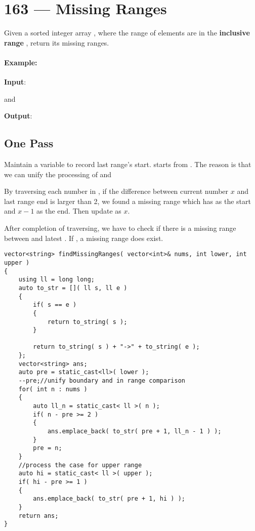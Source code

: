 \section{163 --- Missing Ranges}
Given a sorted integer array , where the range of elements are in the \textbf{inclusive range} , return its missing ranges.

\paragraph{Example:}

\begin{flushleft}
\textbf{Input}: 


 and 

\textbf{Output}: \fcj{["2", "4->49", "51->74", "76->99"]}
\end{flushleft}

\subsection{One Pass}

Maintain a variable  to record last range's start.  starts from . The reason is that we can unify the processing of  and 

By traversing each number in , if the difference between current number $x$ and last range end  is larger than 2, we found a missing range which has  as the start and $x-1$ as the end. Then update  as $x$.

After completion of traversing, we have to check if there is a missing range between  and latest . If , a missing range  does exist.

\setcounter{lstlisting}{0}
\begin{lstlisting}[style=customc, caption={One Pass}]
vector<string> findMissingRanges( vector<int>& nums, int lower, int upper )
{
    using ll = long long;
    auto to_str = []( ll s, ll e )
    {
        if( s == e )
        {
            return to_string( s );
        }

        return to_string( s ) + "->" + to_string( e );
    };
    vector<string> ans;
    auto pre = static_cast<ll>( lower );
    --pre;//unify boundary and in range comparison
    for( int n : nums )
    {
        auto ll_n = static_cast< ll >( n );
        if( n - pre >= 2 )
        {
            ans.emplace_back( to_str( pre + 1, ll_n - 1 ) );
        }
        pre = n;
    }
    //process the case for upper range
    auto hi = static_cast< ll >( upper );
    if( hi - pre >= 1 )
    {
        ans.emplace_back( to_str( pre + 1, hi ) );
    }
    return ans;
}
\end{lstlisting}